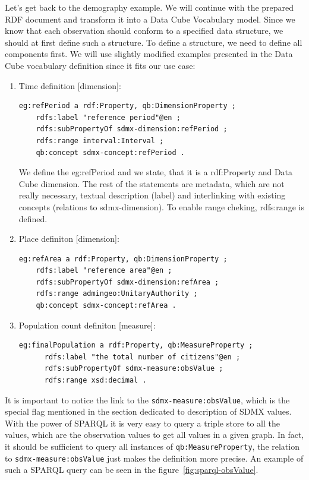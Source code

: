 Let’s get back to the demography example. We will continue with the prepared RDF
document and transform it into a Data Cube Vocabulary model. Since we know that each
observation should conform to a specified data structure, we should at first define
such a structure. To define a structure, we need to define all components first.
We will use slightly modified examples presented in the Data Cube vocabulary
definition since it fits our use case:

\begin{enumerate}
\item Time definition [dimension]:

\begin{verbatim}
eg:refPeriod a rdf:Property, qb:DimensionProperty ;
    rdfs:label "reference period"@en ;
    rdfs:subPropertyOf sdmx-dimension:refPeriod ;
    rdfs:range interval:Interval ;
    qb:concept sdmx-concept:refPeriod .
\end{verbatim}

We define the eg:refPeriod and we state, that it is a rdf:Property and Data Cube dimension.
The rest of the statements are metadata, which are not really necessary, textual description
(label) and interlinking with existing concepts (relations to sdmx-dimension). To enable range
cheking, rdfs:range is defined.

\item Place definiton [dimension]:

\begin{verbatim}
eg:refArea a rdf:Property, qb:DimensionProperty ;
    rdfs:label "reference area"@en ;
    rdfs:subPropertyOf sdmx-dimension:refArea ;
    rdfs:range admingeo:UnitaryAuthority ;
    qb:concept sdmx-concept:refArea .
\end{verbatim}

\item Population count definiton [measure]:
\begin{verbatim}
eg:finalPopulation a rdf:Property, qb:MeasureProperty ;
      rdfs:label "the total number of citizens"@en ;
      rdfs:subPropertyOf sdmx-measure:obsValue ;
      rdfs:range xsd:decimal .
\end{verbatim}
\end{enumerate}

It is important to notice the link to the \texttt{sdmx-measure:obsValue}, which is the special flag
mentioned in the section dedicated to description of SDMX values. With the power of SPARQL
it is very easy to query a triple store to all the values, which are the observation values to get
all values in a given graph. In fact, it should be sufficient to query all instances of
\texttt{qb:MeasureProperty}, the relation to \texttt{sdmx-measure:obsValue} just makes the definition
more precise. An example of such a SPARQL query can be seen in the 
figure~\ref{fig:sparql-obsValue}.

